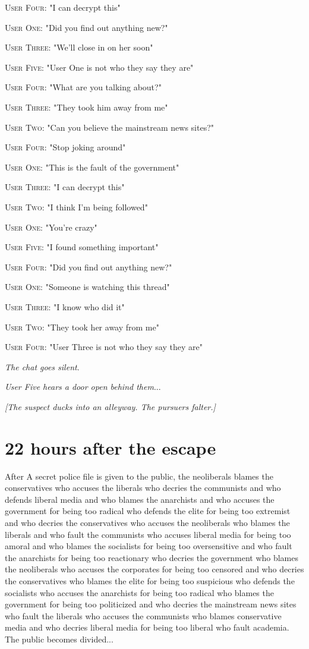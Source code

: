 \documentclass{report}
\begin{document}
\textsc{User Four}: "I can decrypt this" 

\textsc{User One}: "Did you find out anything new?" 

\textsc{User Three}: "We'll close in on her soon" 

\textsc{User Five}: "User One is not who they say they are" 

\textsc{User Four}: "What are you talking about?" 

\textsc{User Three}: "They took him away from me" 

\textsc{User Two}: "Can you believe the mainstream news sites?" 

\textsc{User Four}: "Stop joking around" 

\textsc{User One}: "This is the fault of the government" 

\textsc{User Three}: "I can decrypt this" 

\textsc{User Two}: "I think I'm being followed" 

\textsc{User One}: "You're crazy" 

\textsc{User Five}: "I found something important" 

\textsc{User Four}: "Did you find out anything new?" 

\textsc{User One}: "Someone is watching this thread" 

\textsc{User Three}: "I know who did it" 

\textsc{User Two}: "They took her away from me" 

\textsc{User Four}: "User Three is not who they say they are" 

\textit{The chat goes silent}. 

\textit{User Five hears a door open behind them}...

\textit{[The suspect ducks into an alleyway. The pursuers falter.]}


\section*{22 \small{hours after the escape}}

After A secret police file is given to the public, the neoliberals blames the conservatives who accuses the liberals who decries the communists and who defends liberal media and who blames the anarchists and who accuses the government for being too radical who defends the elite for being too extremist and who decries the conservatives who accuses the neoliberals who blames the liberals and who fault the communists who accuses liberal media for being too amoral and who blames the socialists for being too oversensitive and who fault the anarchists for being too reactionary who decries the government who blames the neoliberals who accuses the corporates for being too censored and who decries the conservatives who blames the elite for being too suspicious who defends the socialists who accuses the anarchists for being too radical who blames the government for being too politicized and who decries the mainstream news sites who fault the liberals who accuses the communists who blames conservative media and who decries liberal media for being too liberal who fault academia. The public becomes divided...
\end{document}
